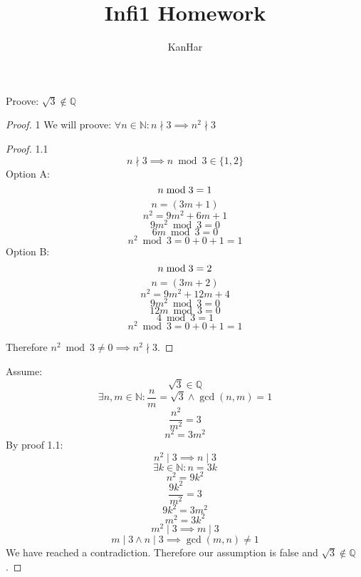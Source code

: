 \documentclass[12pt]{article}
\newenvironment{problem}[2][Problem]{\begin{trivlist}
\item[\hskip \labelsep {\bfseries #1}\hskip \labelsep {\bfseries #2.}]}{\end{trivlist}}
\begin{document}
 
 
\title{Infi1 Homework}
\author{KanHar}
\maketitle
 
\begin{problem}{1}
Proove: $\sqrt{3} \notin \mathbb{Q}$
\end{problem}

\begin{proof}{1}
We will proove: $\forall n \in \mathbb{N}: n \nmid 3 \implies n^2 \nmid 3$
\begin{proof}{1.1} \label{p1_1}
$$n \nmid 3 \implies n\bmod{3} \in \{1,2\}$$
Option A: $$n \bmod{3} = 1 \newline$$
$$n = (3m+1)$$
$$n^2 = 9m^2 + 6m + 1$$
$$9m^2\bmod3=0$$
$$6m\bmod3=0$$
$$n^2\bmod{3} = 0+0+1 = 1$$
Option B: $$n \bmod{3} = 2 \newline$$
$$n = (3m+2)$$
$$n^2 = 9m^2 + 12m + 4$$
$$9m^2\bmod3=0$$
$$12m\bmod3=0$$
$$4\bmod3=1$$
$$n^2\bmod{3} = 0+0+1 = 1$$

Therefore $n^2 \bmod{3} \ne 0 \implies  n^2 \nmid 3$.
\end{proof}
Assume: $$\sqrt{3} \in \mathbb{Q}$$
$$\exists{n,m}\in \mathbb{N}: \frac{n}{m} = \sqrt{3} \land \gcd(n,m)=1$$
$$\frac{n^2}{m^2}=3$$
$$n^2 = 3m^2$$
By proof 1.1:
$$n^2 \mid 3 \implies n \mid 3$$
$$\exists k \in \mathbb{N}:n = 3k$$
$$n^2 = 9k^2$$
$$\frac{9k^2}{m^2}=3$$
$$9k^2 = 3m^2$$
$$m^2 = 3k^2$$
$$m^2 \mid 3 \implies m \mid 3$$
$$m \mid 3 \land n \mid 3 \implies \gcd(m,n) \ne 1$$
We have reached a contradiction. Therefore our assumption is false and $\sqrt{3} \notin \mathbb{Q}$.
\end{proof}
\end{document}
